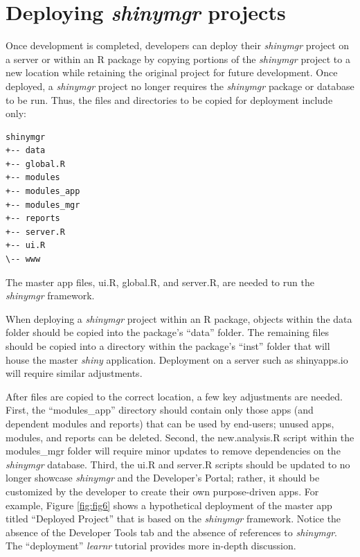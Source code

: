 \section{\texorpdfstring{Deploying \emph{shinymgr} projects}{Deploying shinymgr projects}}\label{appdeploy}

Once development is completed, developers can deploy their \emph{shinymgr} project on a server or within an R package by copying portions of the \emph{shinymgr} project to a new location while retaining the original project for future development. Once deployed, a \emph{shinymgr} project no longer requires the \emph{shinymgr} package or database to be run. Thus, the files and directories to be copied for deployment include only:

\begin{verbatim}
shinymgr
+-- data
+-- global.R
+-- modules
+-- modules_app
+-- modules_mgr
+-- reports
+-- server.R
+-- ui.R
\-- www
\end{verbatim}

The master app files, ui.R, global.R, and server.R, are needed to run the \emph{shinymgr} framework.

When deploying a \emph{shinymgr} project within an R package, objects within the data folder should be copied into the package's ``data'' folder. The remaining files should be copied into a directory within the package's ``inst'' folder that will house the master \emph{shiny} application. Deployment on a server such as shinyapps.io will require similar adjustments.

After files are copied to the correct location, a few key adjustments are needed. First, the ``modules\_app'' directory should contain only those apps (and dependent modules and reports) that can be used by end-users; unused apps, modules, and reports can be deleted. Second, the new.analysis.R script within the modules\_mgr folder will require minor updates to remove dependencies on the \emph{shinymgr} database. Third, the ui.R and server.R scripts should be updated to no longer showcase \emph{shinymgr} and the Developer's Portal; rather, it should be customized by the developer to create their own purpose-driven apps. For example, Figure \ref{fig:fig6} shows a hypothetical deployment of the master app titled ``Deployed Project'' that is based on the \emph{shinymgr} framework. Notice the absence of the Developer Tools tab and the absence of references to \emph{shinymgr}. The ``deployment'' \emph{learnr} tutorial provides more in-depth discussion.

